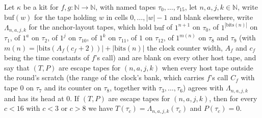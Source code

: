 \begin{theorem}
\label{Turing.NTimeDiag.QyEscT.tp}
\leanok
{}
Let $\kappa$ be a kit for $f, g : \mathbb{N} \to \mathbb{N}$, with named tapes $\tau_0, \dots,
\tau_{15}$, let $n, a, j, k \in \mathbb{N}$, write $\mathrm{buf}(w)$ for the tape holding $w$ in
cells $0, \dots, |w| - 1$ and blank elsewhere, write $\Lambda_{n,a,j,k}$ for the anchor-layout
tapes, which hold $\mathrm{buf}$ of $1^{n+1}$ on $\tau_0$, of $1^{|\mathrm{bits}(n)|}$ on $\tau_1$,
of $1^a$ on $\tau_2$, of $1^j$ on $\tau_{10}$, of $1^k$ on $\tau_{11}$, of $1$ on $\tau_{12}$, of
$1^{m(n)}$ on $\tau_8$ and $\tau_9$ (with $m(n) = |\mathrm{bits}(A_f(c_f + 2))| +
|\mathrm{bits}(n)|$ the clock counter width, $A_f$ and $c_f$ being the time constants of $f$'s
call) and are blank on every other host tape, and say that $(T, P)$ are escape tapes for $(n, a, j,
k)$ when every host tape outside the round's scratch (the range of the clock's bank, which carries
$f$'s call $C_f$ with tape $0$ on $\tau_7$ and its counter on $\tau_8$, together with $\tau_3,
\dots, \tau_6$) agrees with $\Lambda_{n,a,j,k}$ and has its head at $0$. If $(T, P)$ are escape
tapes for $(n, a, j, k)$, then for every $c < 16$ with $c < 3$ or $c > 8$ we have $T(\tau_c) =
\Lambda_{n,a,j,k}(\tau_c)$ and $P(\tau_c) = 0$.
\end{theorem}

